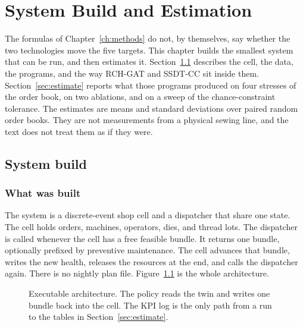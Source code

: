 \chapter{System Build and Estimation}
\label{ch:estimation}

The formulas of Chapter~\ref{ch:methods} do not, by themselves, say whether the two technologies move the five targets. This chapter builds the smallest system that can be run, and then estimates it. Section~\ref{sec:build} describes the cell, the data, the programs, and the way RCH-GAT and SSDT-CC sit inside them. Section~\ref{sec:estimate} reports what those programs produced on four stresses of the order book, on two ablations, and on a sweep of the chance-constraint tolerance. The estimates are means and standard deviations over paired random order books. They are not measurements from a physical sewing line, and the text does not treat them as if they were.

\section{System build}
\label{sec:build}

\subsection{What was built}

The system is a discrete-event shop cell and a dispatcher that share one state. The cell holds orders, machines, operators, dies, and thread lots. The dispatcher is called whenever the cell has a free feasible bundle. It returns one bundle, optionally prefixed by preventive maintenance. The cell advances that bundle, writes the new health, releases the resources at the end, and calls the dispatcher again. There is no nightly plan file. Figure~\ref{fig:architecture} is the whole architecture.

\begin{figure}[ht]
\centering
{}
\caption{Executable architecture. The policy reads the twin and writes one bundle back into the cell. The KPI log is the only path from a run to the tables in Section~\ref{sec:estimate}.}
\label{fig:architecture}
\end{figure}

